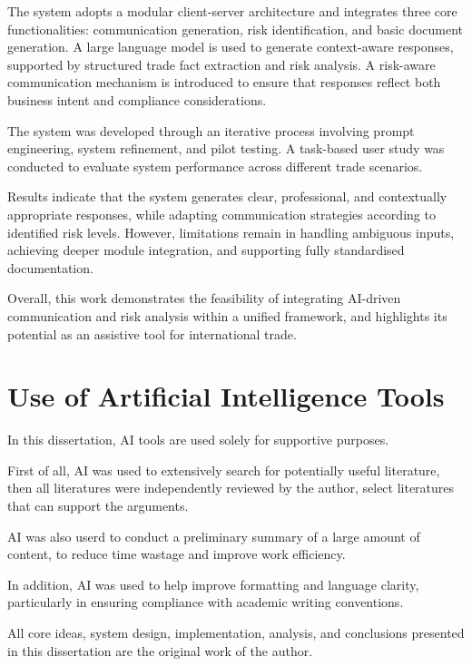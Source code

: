 \documentclass[12pt,a4paper]{report}
\begin{document}
The system adopts a modular client-server architecture and integrates three core functionalities: communication generation, risk identification, and basic document generation. A large language model is used to generate context-aware responses, supported by structured trade fact extraction and risk analysis. A risk-aware communication mechanism is introduced to ensure that responses reflect both business intent and compliance considerations.

The system was developed through an iterative process involving prompt engineering, system refinement, and pilot testing. A task-based user study was conducted to evaluate system performance across different trade scenarios.

Results indicate that the system generates clear, professional, and contextually appropriate responses, while adapting communication strategies according to identified risk levels. However, limitations remain in handling ambiguous inputs, achieving deeper module integration, and supporting fully standardised documentation.

Overall, this work demonstrates the feasibility of integrating AI-driven communication and risk analysis within a unified framework, and highlights its potential as an assistive tool for international trade.


\section*{Use of Artificial Intelligence Tools}

In this dissertation, AI tools are used solely for supportive purposes.

First of all, AI was used to extensively search for potentially useful literature, then all literatures were independently reviewed by the author, select literatures that can support the arguments.

AI was also userd to conduct a preliminary summary of a large amount of content, to reduce time wastage and improve work efficiency.

In addition, AI was used to help improve formatting and language clarity, particularly in ensuring compliance with academic writing conventions.

All core ideas, system design, implementation, analysis, and conclusions presented in this dissertation are the original work of the author.

%
\end{document}

